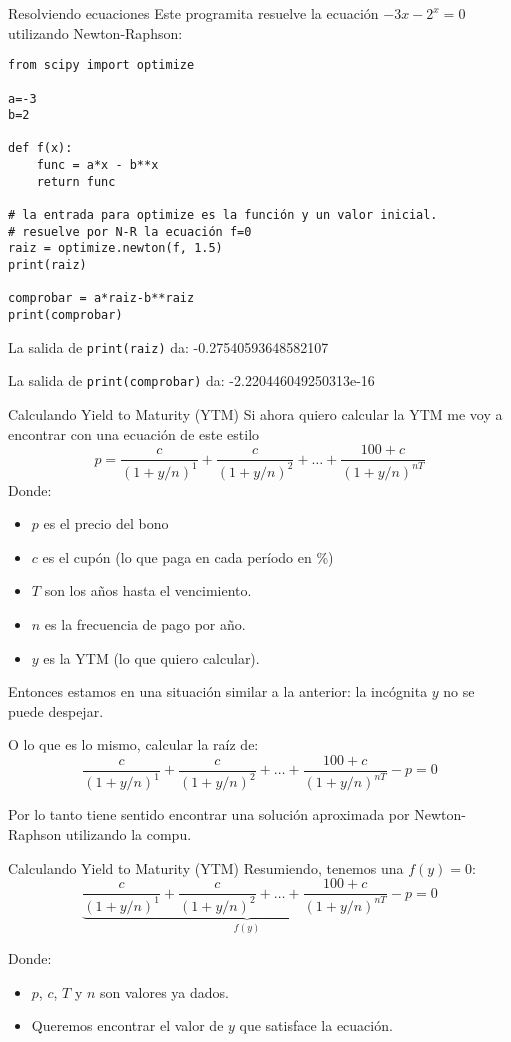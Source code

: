 \documentclass[handout,9pt]{beamer}
\begin{document}
\begin{frame}[fragile]{Resolviendo ecuaciones}
Este programita resuelve la ecuación $ -3x-2^x=0$ utilizando Newton-Raphson:
\normalsize{\begin{verbatim}
from scipy import optimize

a=-3
b=2

def f(x):
    func = a*x - b**x 
    return func

# la entrada para optimize es la función y un valor inicial.
# resuelve por N-R la ecuación f=0
raiz = optimize.newton(f, 1.5)
print(raiz)

comprobar = a*raiz-b**raiz
print(comprobar)
\end{verbatim}}\pause
La salida de \verb|print(raiz)| da: -0.27540593648582107 \pause

La salida de \verb|print(comprobar)| da: -2.220446049250313e-16

\end{frame}




\begin{frame}[fragile]{Calculando Yield to Maturity (YTM)}
Si ahora quiero calcular la YTM me voy a encontrar con una ecuación de este estilo
$$ p = \dfrac{c}{(1+y/n)^{1}} + \dfrac{c}{(1+y/n)^{2}} + \dots + \dfrac{100+c}{(1+y/n)^{nT}}$$
Donde:
\begin{itemize}
	\item $p$ es el precio del bono
	\item $c$ es el cupón (lo que paga en cada período en \%)
	\item $T$ son los años hasta el vencimiento.
	\item $n$ es la frecuencia de pago por año.
	\item $y$ es la YTM (lo que quiero calcular).
\end{itemize}
Entonces estamos en una situación similar a la anterior: la incógnita $y$ no se puede despejar. \pause

O lo que es lo mismo, calcular la raíz de:
$$ \dfrac{c}{(1+y/n)^{1}} + \dfrac{c}{(1+y/n)^{2}} + \dots + \dfrac{100+c}{(1+y/n)^{nT}} - p = 0$$

Por lo tanto tiene sentido encontrar una solución aproximada por Newton-Raphson utilizando la compu.
\end{frame}


\begin{frame}[fragile]{Calculando Yield to Maturity (YTM)}
Resumiendo, tenemos una $f(y)=0$:
$$ \underbrace{\dfrac{c}{(1+y/n)^{1}} + \dfrac{c}{(1+y/n)^{2}} + \dots + \dfrac{100+c}{(1+y/n)^{nT}} - p}_{f(y)} = 0$$

Donde:
\begin{itemize}
	\item $p$, $c$, $T$ y $n$ son valores ya dados.
	\item Queremos encontrar el valor de $y$ que satisface la ecuación.
\end{itemize}
\end{frame}
\end{document}
